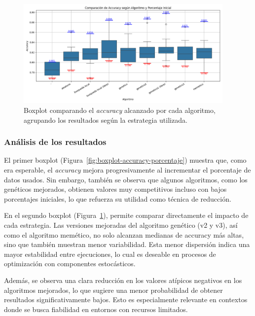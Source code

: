 \begin{figure}[!h]
    \centering
    \includegraphics[width=0.95\textwidth]{imagenes/mobilenet-BOXPLOT-accuracy-algoritmo}
    \caption{Boxplot comparando el \textit{accuracy} alcanzado por cada algoritmo, agrupando los resultados según la estrategia utilizada.}
    \label{fig:boxplot-accuracy-algoritmo}
\end{figure}

\subsubsection{Análisis de los resultados}\label{sec:analisis-de-los-resultados}

El primer boxplot (Figura~\ref{fig:boxplot-accuracy-porcentaje}) muestra que, como era esperable,
el \textit{accuracy} mejora progresivamente al incrementar el porcentaje de datos usados.
Sin embargo, también se observa que algunos algoritmos, como los genéticos mejorados, obtienen valores muy competitivos
incluso con bajos porcentajes iniciales, lo que refuerza su utilidad como técnica de reducción.


En el segundo boxplot (Figura~\ref{fig:boxplot-accuracy-algoritmo}), permite comparar directamente el impacto de cada estrategia.
Las versiones mejoradas del algoritmo genético (v2 y v3), así como el algoritmo memético,
no solo alcanzan medianas de accuracy más altas, sino que también muestran menor variabilidad.
Esta menor dispersión indica una mayor estabilidad entre ejecuciones, lo cual es deseable en procesos
de optimización con componentes estocásticos.


Además, se observa una clara reducción en los valores atípicos negativos en los algoritmos mejorados, lo que sugiere una menor
probabilidad de obtener resultados significativamente bajos.
Esto es especialmente relevante en contextos donde se busca fiabilidad en entornos con recursos limitados.


